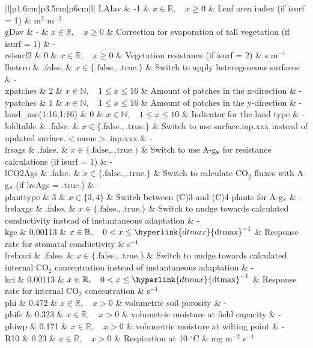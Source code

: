 \documentclass[twoside,11pt,fleqn,a4paper,english,openright]{report}
\begin{document}
\begin{center}
\begin{supertabular}{|l|p{1.6cm}|p{3.5cm}|p{6cm}|l|}
  LAIav	& -1	& $x \in \mathbb{R}, \quad x \ge 0$	& Leaf area index (if isurf = 1)	& m$^{2}$ m$^{-2}$\\
  gDav	& -	& $x \in \mathbb{R}, \quad x \ge 0$	& Correction for evaporation of tall vegetation (if isurf = 1) & -\\
  rsisurf2	& 0	& $x \in \mathbb{R}, \quad x \ge 0$	& Vegetation resistance (if isurf = 2)	& s m$^{-1}$\\
  lhetero & .false. & $x\in\{\text{.false.},\text{.true.}\}$ & Switch to apply heterogeneous surfaces & - \\
  xpatches & 2 & $x \in \mathbb{N}, \quad 1 \leq x \leq 16$ & Amount of patches in the x-direction & - \\
  ypatches & 1 & $x \in \mathbb{N}, \quad 1 \leq x \leq 16$ & Amount of patches in the y-direction & - \\
  land\_use(1:16,1:16) & 0 & $x \in \mathbb{N}, \quad 1 \leq x \leq 10$ & Indicator for the land type & - \\
  loldtable & .false. & $x\in\{\text{.false.},\text{.true.}\}$  & Switch to use surface.inp.xxx instead of updated surface.$<$name$>$.inp.xxx & - \\ 
  \hypertarget{lrsags}{lrsags}	& .false. & $x\in\{\text{.false.},\text{.true.}\}$  & Switch to use A-g$_{\rm s}$ for resistance calculations (if isurf = 1) & - \\ 
  lCO2Ags	& .false. & $x\in\{\text{.false.},\text{.true.}\}$  & Switch to calculate CO$_2$ fluxes with A-g$_{\rm s}$  (if lrsAgs = .true.) & - \\ 
  planttype & 3	& $x \in \{3, 4\}$	& Switch between (C)3 and (C)4 plants for A-g$_{\rm s}$ & - \\
  lrelaxgc	& .false. & $x\in\{\text{.false.},\text{.true.}\}$  & Switch to nudge towards calculated conductivity instead of instantaneous adaptation & - \\ 
  kgc		& 0.00113 & $x \in \mathbb{R}, \quad 0 < x \le \hyperlink{dtmax}{\text{dtmax}}^{-1}$	& Response rate for stomatal conductivity	& s$^{-1}$\\
  lrelaxci	& .false. & $x\in\{\text{.false.},\text{.true.}\}$  & Switch to nudge towards calculated internal CO$_2$ concentration instead of instantaneous adaptation & - \\ 
  kci		& 0.00113 & $x \in \mathbb{R}, \quad 0 < x \le \hyperlink{dtmax}{\text{dtmax}}^{-1}$	& Response rate for internal CO$_2$ concentration	& s$^{-1}$\\
  phi		& 0.472	& $x \in \mathbb{R}, \quad x > 0$	& volumetric soil porosity & - \\
  phifc		& 0.323	& $x \in \mathbb{R}, \quad x > 0$	& volumetric moisture at field capacity & - \\
  phiwp		& 0.171	& $x \in \mathbb{R}, \quad x > 0$	& volumetric moisture at wilting point & - \\
  R10		& 0.23	& $x \in \mathbb{R}, \quad x > 0$	& Respiration at 10 $^{\circ}$C & mg m$^{-2}$ s$^{-1}$ \\
\end{supertabular}


\end{center}
\end{document}
